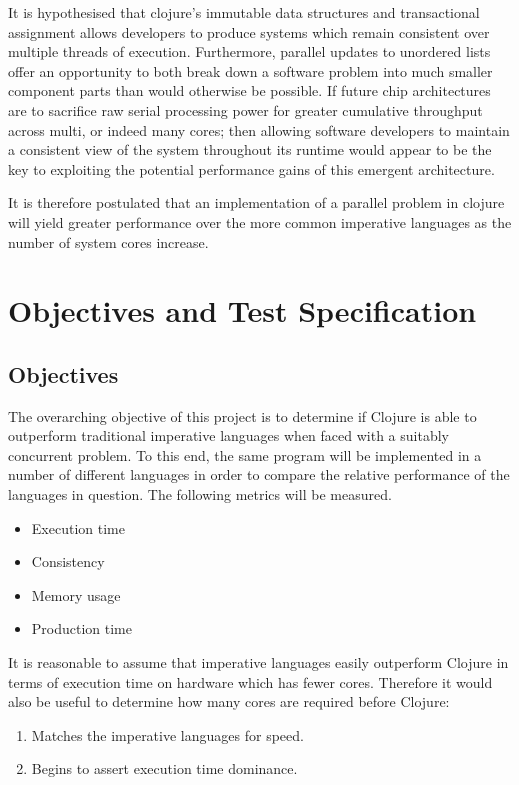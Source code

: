 \documentclass[12pt,a4paper]{article}
\begin{document}
It is hypothesised that clojure's immutable data structures and transactional assignment allows developers to produce systems which remain consistent over multiple threads of execution. Furthermore, parallel updates to unordered lists offer an opportunity to both   break down a software problem into much smaller component parts than would otherwise be possible. If future chip architectures are to sacrifice raw serial processing power for greater cumulative throughput across multi, or indeed many cores; then allowing software developers to maintain a consistent view of the system throughout its runtime would appear to be the key to exploiting the potential performance gains of this emergent architecture.

It is therefore postulated that an implementation of a parallel problem in clojure will yield greater performance over the more common imperative languages as the number of system cores increase.

\newpage
\section{Objectives and Test Specification}

\subsection{Objectives}

The overarching objective of this project is to determine if Clojure is able to outperform traditional imperative languages when faced with a suitably concurrent problem. To this end, the same program will be implemented in a number of different languages in order to compare the relative performance of the languages in question. The following metrics will be measured.

\begin{itemize} \itemsep0pt
    \item Execution time
    \item Consistency
    \item Memory usage
    \item Production time
\end{itemize}

It is reasonable to assume that imperative languages easily outperform Clojure in terms of execution time on hardware which has fewer cores. Therefore it would also be useful to determine how many cores are required before Clojure:

\begin{enumerate} \itemsep0pt
    \item Matches the imperative languages for speed.
    \item Begins to assert execution time dominance.
\end{enumerate}
\end{document}
